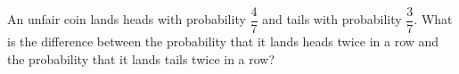 An unfair coin lands heads with probability $\dfrac47$ and tails with probability $\dfrac37$. What is the difference between the probability that it lands heads twice in a row and the probability that it lands tails twice in a row?

